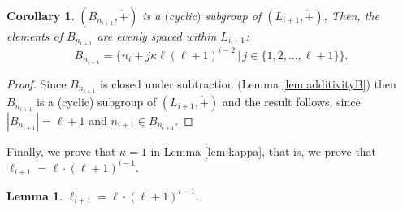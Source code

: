 \documentclass{article}
\newtheorem{corollary}[theorem]{Corollary}
\newtheorem{lemma}[theorem]{Lemma}
\begin{document}
\begin{corollary}\label{cor:Bni+1}
$(B_{n_{i+1}},  \dot{+})$ is a $($cyclic$)$ subgroup of $(L_{i+1}, \dot{+})$, Then, the elements of $B_{n_{i+1}}$ are evenly spaced within $L_{i+1}$: $$B_{n_{i+1}}=\{n_i+j\kappa \ell (\ell+1)^{i-2}\, |\, j\in\{ 1, 2, \dots, \ell+1\}\} .$$
\end{corollary}
\begin{proof}
Since $B_{n_{i+1}}$ is closed under subtraction (Lemma \ref{lem:additivityB}) then $B_{n_{i+1}}$ is a (cyclic) subgroup of $(L_{i+1}, \dot{+})$ and the result follows, since $|B_{n_{i+1}}|=\ell +1$ and $n_{i+1}\in B_{n_{i+1}}$.
\end{proof}



Finally, we prove that $\kappa=1$ in Lemma \ref{lem:kappa}, that is, we prove that $\ell_{i+1}=\ell\cdot(\ell+1)^{i-1}$.

\begin{lemma}\label{cor:final}
$\ell_{i+1}=\ell\cdot(\ell+1)^{i-1}$.
\end{lemma}
\end{document}
